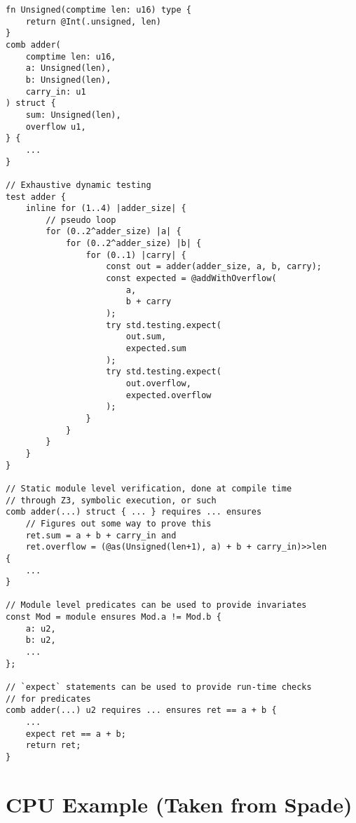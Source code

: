 \documentclass[10pt]{article}
\begin{document}
\begin{verbatim}
fn Unsigned(comptime len: u16) type {
    return @Int(.unsigned, len)
}
comb adder(
    comptime len: u16,
    a: Unsigned(len),
    b: Unsigned(len),
    carry_in: u1
) struct {
    sum: Unsigned(len),
    overflow u1,
} {
    ...
}

// Exhaustive dynamic testing
test adder {
    inline for (1..4) |adder_size| {
        // pseudo loop
        for (0..2^adder_size) |a| {
            for (0..2^adder_size) |b| {
                for (0..1) |carry| {
                    const out = adder(adder_size, a, b, carry);
                    const expected = @addWithOverflow(
                        a,
                        b + carry
                    );
                    try std.testing.expect(
                        out.sum,
                        expected.sum
                    );
                    try std.testing.expect(
                        out.overflow,
                        expected.overflow
                    );
                }
            }
        }
    }
}

// Static module level verification, done at compile time
// through Z3, symbolic execution, or such
comb adder(...) struct { ... } requires ... ensures 
    // Figures out some way to prove this
    ret.sum = a + b + carry_in and
    ret.overflow = (@as(Unsigned(len+1), a) + b + carry_in)>>len 
{
    ...
}

// Module level predicates can be used to provide invariates
const Mod = module ensures Mod.a != Mod.b {
    a: u2,
    b: u2,
    ...
};

// `expect` statements can be used to provide run-time checks
// for predicates
comb adder(...) u2 requires ... ensures ret == a + b {
    ...
    expect ret == a + b;
    return ret;
}
\end{verbatim}

\section{CPU Example (Taken from Spade)}
\end{document}

